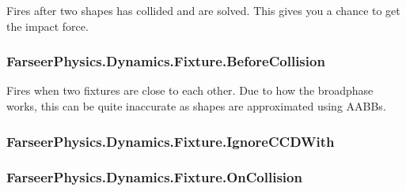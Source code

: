 Fires after two shapes has collided and are solved. This gives you a chance to get the impact force. 

\hypertarget{class_farseer_physics_1_1_dynamics_1_1_fixture_a9e73f7e383d0941bcc9ef7fc1bf0ea92}{
\subsubsection[{Before\+Collision}]{ Farseer\+Physics.\+Dynamics.\+Fixture.\+Before\+Collision}}\label{class_farseer_physics_1_1_dynamics_1_1_fixture_a9e73f7e383d0941bcc9ef7fc1bf0ea92}


Fires when two fixtures are close to each other. Due to how the broadphase works, this can be quite inaccurate as shapes are approximated using A\+A\+B\+Bs. 

\hypertarget{class_farseer_physics_1_1_dynamics_1_1_fixture_a2ec39ce7297a4ad7672d2956cd2eb6bf}{
\subsubsection[{Ignore\+C\+C\+D\+With}]{ Farseer\+Physics.\+Dynamics.\+Fixture.\+Ignore\+C\+C\+D\+With}}\label{class_farseer_physics_1_1_dynamics_1_1_fixture_a2ec39ce7297a4ad7672d2956cd2eb6bf}
\hypertarget{class_farseer_physics_1_1_dynamics_1_1_fixture_a2410f992b5c7b8ac41fa19018d1ff0b3}{
\subsubsection[{On\+Collision}]{ Farseer\+Physics.\+Dynamics.\+Fixture.\+On\+Collision}}\label{class_farseer_physics_1_1_dynamics_1_1_fixture_a2410f992b5c7b8ac41fa19018d1ff0b3}



